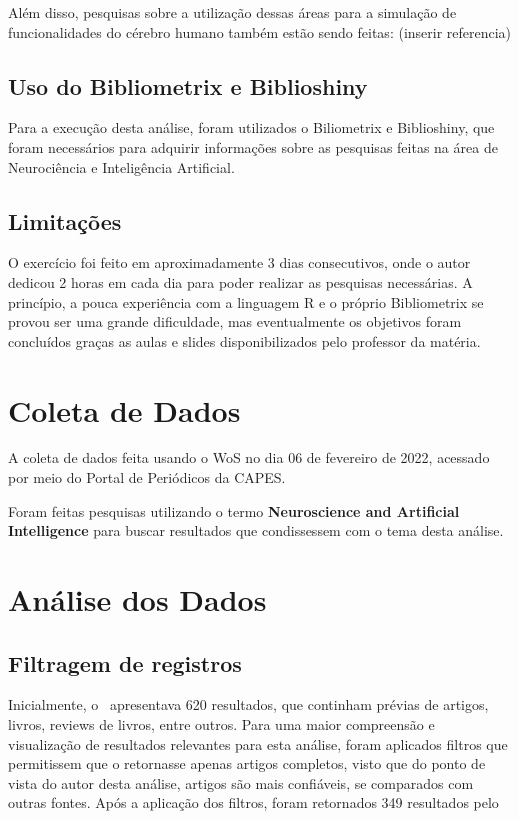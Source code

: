 Além disso, pesquisas sobre a utilização dessas áreas para a simulação de funcionalidades do cérebro humano também estão sendo feitas: (inserir referencia)

\subsection{Uso do Bibliometrix e Biblioshiny}

Para a execução desta análise, foram utilizados o Biliometrix e Biblioshiny, que foram necessários para adquirir informações sobre as pesquisas feitas na área de Neurociência e Inteligência Artificial.

\subsection{Limitações}

O exercício foi feito em aproximadamente 3 dias consecutivos, onde o autor dedicou 2 horas em cada dia para poder realizar as pesquisas necessárias. A princípio, a pouca experiência com a linguagem R e o próprio Bibliometrix se provou ser uma grande dificuldade, mas eventualmente os objetivos foram concluídos graças as aulas e slides disponibilizados pelo professor da matéria.

\section{Coleta de Dados}

A coleta de dados feita usando o WoS no dia 06 de fevereiro de 2022, acessado por meio do Portal de Periódicos da CAPES.

Foram feitas pesquisas utilizando o termo \textbf{Neuroscience and Artificial Intelligence} para buscar resultados que condissessem com o tema desta análise.

\section{Análise dos Dados}

\subsection{Filtragem de registros}

Inicialmente, o \dataset\ apresentava 620 resultados, que continham prévias de artigos, livros, reviews de livros, entre outros. Para uma maior compreensão e visualização de resultados relevantes para esta análise, foram aplicados filtros que permitissem que o \dataset retornasse apenas artigos completos, visto que do ponto de vista do autor desta análise, artigos são mais confiáveis, se comparados com outras fontes. Após a aplicação dos filtros, foram retornados 349 resultados pelo \dataset 

